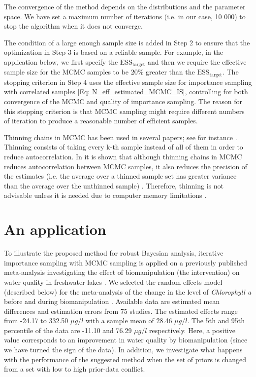 \documentclass{amsart}
\theoremstyle{plain}%
\begin{document}
The convergence of the method depends on the distributions and the parameter space. We have set a maximum number of iterations (i.e. in our case, 10 000) to stop the algorithm when it does not converge. 


The condition of a large enough sample size is added in Step 2 to ensure that the 
optimization in Step 3 is based on a reliable sample. For example, in the application below, we first specify the $\mathrm{ESS_{target}}$ and then we require the effective sample size for the MCMC samples to be 20\% greater than the $\mathrm{ESS_{target}}$.
The stopping criterion in Step 4 uses the effective sample size for importance sampling with correlated samples \cref{Eq: N_eff_estimated_MCMC_IS}, 
controlling for both convergence of the MCMC and quality of importance sampling.
The reason for this stopping criterion is that MCMC sampling might require different numbers of iteration to produce a reasonable number of efficient samples.

Thinning chains in MCMC has been used in several papers; see for instance \citep{Croll_2006, Endo_2019, Kopylev_2009}. Thinning consists of taking every k-th sample instead of all of them in order to reduce autocorrelation. In \citep{Link_2012} it is shown that although thinning chains in MCMC reduces autocorrelation between MCMC samples, it also reduces the precision of the estimates (i.e.  the average over a thinned sample set has greater variance than the average over the unthinned sample) \citep{Geyer_1992}. Therefore, thinning is not advisable unless it is needed due to computer memory limitations \citep{Link_2012}. 

\section{An application}

To illustrate the proposed method for robust Bayesian analysis, iterative importance sampling with MCMC sampling is applied on a previously published meta-analysis investigating the effect of biomanipulation (the intervention) on water quality in freshwater lakes \citep{Bernes_2015}. 
We selected the random effects model (described below) for the meta-analysis of the change in the level of \emph{Chlorophyll a} before and during biomanipulation \citep{Bernes_2015}. Available data are estimated mean differences and estimation errors from 75 studies. The estimated effects range from -24.17 to 332.50 $\mu g/ l$ with a sample mean of 28.46 $\mu g/ l$. 
The 5th and 95th percentile of the data are -11.10 and 76.29 $\mu g/ l$ respectively. Here, a positive value corresponds to an improvement in water quality by biomanipulation (since we have turned the sign of the data). 
In addition, we investigate what happens with the performance of the suggested method when 
the set of priors is changed from a set with low to high prior-data conflict.
\end{document}
